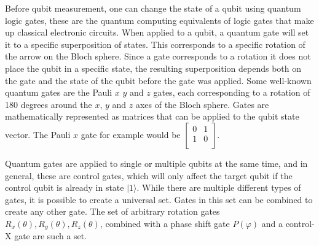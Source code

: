 Before qubit measurement, one can change the state of a qubit using quantum logic gates, these are the quantum computing equivalents of logic 
gates that make up classical electronic circuits. When applied to a qubit, a quantum gate will set it to a specific superposition of states. This corresponds to a 
specific rotation of the arrow on the Bloch sphere\cite{mummaneniLaserControlledImplementationControlledNOT2022}. Since a gate corresponds to a rotation it does not place the qubit in a specific state, the resulting superposition
depends both on the gate and the state of the qubit before the gate was applied. Some well-known quantum gates are the Pauli $x$ $y$ and $z$ gates, each corresponding to a 
rotation of 180 degrees around the $x$, $y$ and $z$ axes of the Bloch sphere. Gates are mathematically represented as matrices that can be applied to the qubit state vector.
The Pauli $x$ gate for example would be $\begin{bmatrix}
    0 & 1\\
    1 & 0\\
\end{bmatrix}$.


Quantum gates are applied to single or multiple qubits at the same time, and in general, these are control gates, which will only affect the target qubit if the control qubit
is already in state $|1 \rangle$. While there are multiple different types of gates, it is possible to create a universal set. Gates in this set can be
combined to create any other gate. The set of arbitrary rotation gates $R_x(\theta), R_y(\theta), R_z(\theta)$, combined with a phase shift gate $P(\varphi)$ and a control-X 
gate are such a set\cite{williamsQuantumGates2011}.
 \newpage

